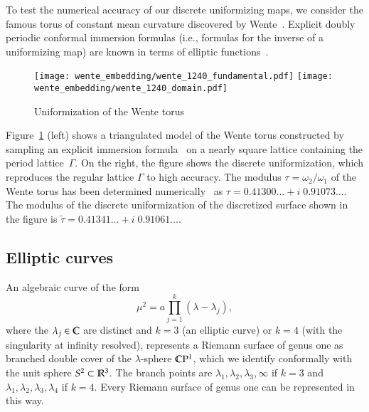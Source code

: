 \documentclass[Thesis]{subfiles}
\begin{document}
To test the numerical accuracy of our discrete uniformizing maps, we
consider the famous torus of constant mean curvature discovered by
Wente~\cite{wente1986}. Explicit doubly periodic conformal immersion
formulas (i.e., formulas for the inverse of a uniformizing map) are
known in terms of elliptic functions~\cite{abresch1987, walter1989, bobenko1991}. 

\begin{figure}
\centering
\texttt{[image: wente\_embedding/wente\_1240\_fundamental.pdf]}\hfill
\texttt{[image: wente\_embedding/wente\_1240\_domain.pdf]}
\caption{Uniformization of the Wente torus}
\label{fig:wente_torus_embedded}
\end{figure}

Figure~\ref{fig:wente_torus_embedded} (left) shows a triangulated model 
of the Wente torus constructed by sampling
an explicit immersion formula~\cite{bobenko1991} on a nearly square
lattice containing the period lattice~$\Gamma$. On the right, the
figure shows the discrete uniformization, which reproduces the regular
lattice $\Gamma$ to high accuracy. The modulus
$\tau=\omega_{2}/\omega_{1}$ of the Wente torus has been determined
numerically~\cite{Heil95} as $\tau =
0.41300\ldots+i\;0.91073\ldots$\;. The modulus of the discrete
uniformization of the discretized surface shown in the figure is
$\tilde \tau = 0.41341\ldots + i\;0.91061\ldots$\;.


\subsection{Elliptic curves}
\label{sec:elliptic_curves}

An algebraic curve of the form
\begin{equation}
  \label{eq:elliptic_curve}
  \mu^{2}=a\prod_{j=1}^{k}(\lambda-\lambda_{j}),
\end{equation}
where the $\lambda_{j}\in\mathbb C$ are distinct and $k=3$ (an elliptic
curve) or $k=4$ (with the singularity at infinity resolved),
represents a Riemann surface of genus one as branched double cover of
the $\lambda$-sphere $\mathbb C\mathrm{P}^{1}$, which we identify conformally
with the unit sphere $S^{2}\subset\mathbb R^{3}$. The branch points are
$\lambda_{1},\lambda_{2},\lambda_{3},\infty$ if $k=3$ and
$\lambda_{1},\lambda_{2},\lambda_{3},\lambda_{4}$ if $k=4$. Every
Riemann surface of genus one can be represented in this way.
\end{document}
